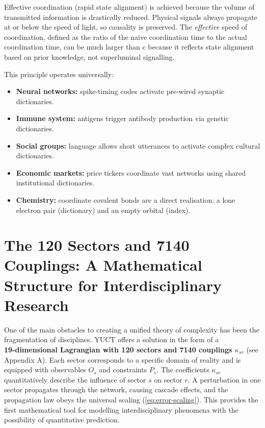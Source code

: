 \documentclass[11pt]{article}
\theoremstyle{remark}
\begin{document}
	Effective coordination (rapid state alignment) is achieved because the volume of transmitted information is drastically reduced. Physical signals always propagate at or below the speed of light, so causality is preserved. The \emph{effective} speed of coordination, defined as the ratio of the naive coordination time to the actual coordination time, can be much larger than \(c\) because it reflects state alignment based on prior knowledge, not superluminal signalling.
	
	This principle operates universally:
	\begin{itemize}
		\item \textbf{Neural networks:} spike‑timing codes activate pre‑wired synaptic dictionaries.
		\item \textbf{Immune system:} antigens trigger antibody production via genetic dictionaries.
		\item \textbf{Social groups:} language allows short utterances to activate complex cultural dictionaries.
		\item \textbf{Economic markets:} price tickers coordinate vast networks using shared institutional dictionaries.
		\item \textbf{Chemistry:} coordinate covalent bonds are a direct realisation: a lone electron pair (dictionary) and an empty orbital (index).
	\end{itemize}
	
	\section{The 120 Sectors and 7140 Couplings: A Mathematical Structure for Interdisciplinary Research}
	\label{sec:sectors}
	
	One of the main obstacles to creating a unified theory of complexity has been the fragmentation of disciplines. YUCT offers a solution in the form of a \textbf{19‑dimensional Lagrangian with 120 sectors and 7140 couplings \(\kappa_{sr}\)} (see Appendix A). Each sector corresponds to a specific domain of reality and is equipped with observables \(O_s\) and constraints \(P_s\). The coefficients \(\kappa_{sr}\) quantitatively describe the influence of sector \(s\) on sector \(r\). A perturbation in one sector propagates through the network, causing cascade effects, and the propagation law obeys the universal scaling (\ref{eq:error-scaling}). This provides the first mathematical tool for modelling interdisciplinary phenomena with the possibility of quantitative prediction.
	
\end{document}
